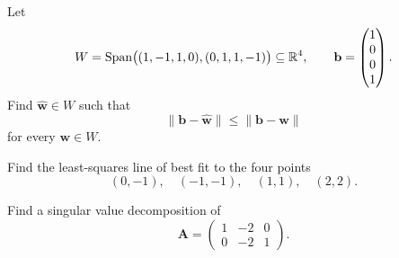 \documentclass[11pt,oneside]{article}
\begin{document}
\begin{problem}
Let
\[
W=\operatorname{Span}\bigl((1,-1,1,0),(0,1,1,-1)\bigr)\subseteq\mathbb{R}^4,
\qquad
\mathbf b=
\begin{pmatrix}1\\0\\0\\1\end{pmatrix}.
\]
Find $\widehat{\mathbf w}\in W$ such that
\[
\|\mathbf b-\widehat{\mathbf w}\|\le\|\mathbf b-\mathbf w\|
\]
for every $\mathbf w\in W$.
\end{problem}

\begin{problem}
Find the least-squares line of best fit to the four points
\[
(0,-1),\quad(-1,-1),\quad(1,1),\quad(2,2).
\]
\end{problem}

\begin{problem}
Find a singular value decomposition of
\[
\mathbf A=
\begin{pmatrix}
1&-2&0\\
0&-2&1
\end{pmatrix}.
\]
\end{problem}
\end{document}

